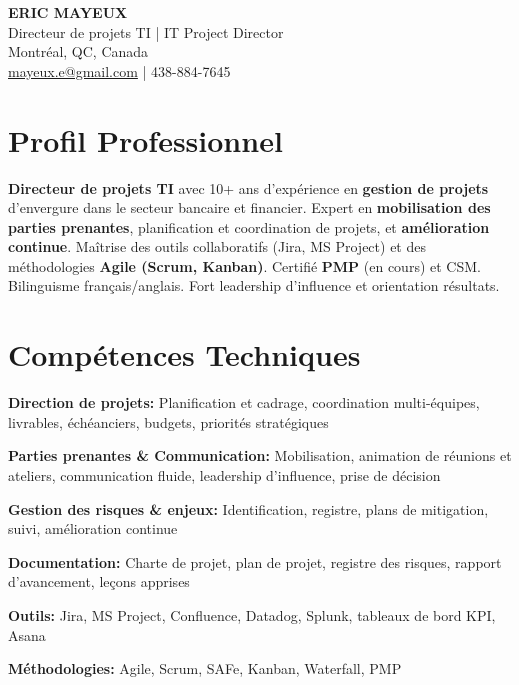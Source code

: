 \documentclass[11pt,a4paper]{article}
\begin{document}
\begin{center}
    {\LARGE \textbf{ERIC MAYEUX}}\\
    \vspace{4pt}
    {\large Directeur de projets TI | IT Project Director}\\
    \vspace{4pt}
    Montréal, QC, Canada\\
    \href{mailto:mayeux.e@gmail.com}{mayeux.e@gmail.com} | 438-884-7645
\end{center}

\vspace{8pt}

\section*{Profil Professionnel}
\noindent
\textbf{Directeur de projets TI} avec 10+ ans d'expérience en \textbf{gestion de projets} d'envergure dans le secteur bancaire et financier. Expert en \textbf{mobilisation des parties prenantes}, planification et coordination de projets, et \textbf{amélioration continue}. Maîtrise des outils collaboratifs (Jira, MS Project) et des méthodologies \textbf{Agile (Scrum, Kanban)}. Certifié \textbf{PMP} (en cours) et CSM. Bilinguisme français/anglais. Fort leadership d'influence et orientation résultats.

\section*{Compétences Techniques}

\textbf{Direction de projets:} Planification et cadrage, coordination multi-équipes, livrables, échéanciers, budgets, priorités stratégiques

\textbf{Parties prenantes \& Communication:} Mobilisation, animation de réunions et ateliers, communication fluide, leadership d'influence, prise de décision

\textbf{Gestion des risques \& enjeux:} Identification, registre, plans de mitigation, suivi, amélioration continue

\textbf{Documentation:} Charte de projet, plan de projet, registre des risques, rapport d'avancement, leçons apprises

\textbf{Outils:} Jira, MS Project, Confluence, Datadog, Splunk, tableaux de bord KPI, Asana

\textbf{Méthodologies:} Agile, Scrum, SAFe, Kanban, Waterfall, PMP
\end{document}
